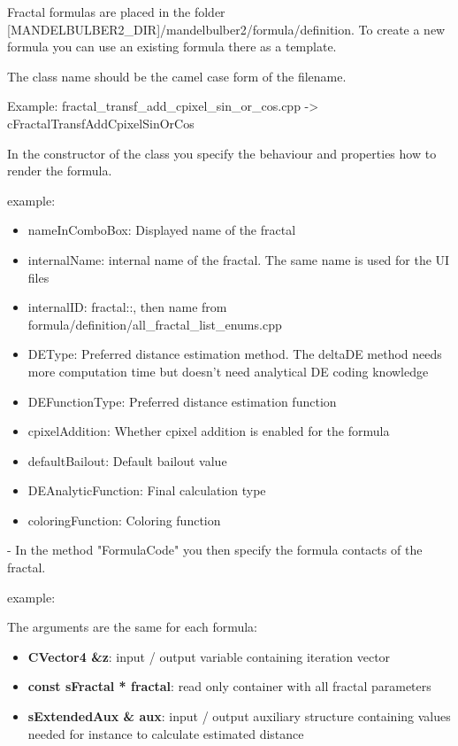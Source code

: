Fractal formulas are placed in the folder [MANDELBULBER2\_DIR]/mandelbulber2/formula/definition.
To create a new formula you can use an existing formula there as a template.

The class name should be the camel case form of the filename.

Example:
fractal\_transf\_add\_cpixel\_sin\_or\_cos.cpp -> cFractalTransfAddCpixelSinOrCos

In the constructor of the class you specify the behaviour and properties how to render the formula.

example:


\begin{itemize}
	\item nameInComboBox: Displayed name of the fractal
	\item internalName: internal name of the fractal. The same name is used for the UI files
	\item internalID: fractal::, then name from formula/definition/all\_fractal\_list\_enums.cpp 
	\item DEType: Preferred distance estimation method. The deltaDE method needs more computation time but doesn't need analytical DE coding knowledge
	\item DEFunctionType: Preferred distance estimation function
	\item cpixelAddition: Whether cpixel addition is enabled for the formula
	\item defaultBailout: Default bailout value
	\item DEAnalyticFunction: Final calculation type
	\item coloringFunction: Coloring function
\end{itemize}

- In the method "FormulaCode" you then specify the formula contacts of the fractal.

example:


The arguments are the same for each formula:
\begin{itemize}
	\item \textbf{CVector4 \&z}: input / output variable containing iteration vector
	\item \textbf{const sFractal * fractal}: read only container with all fractal parameters
	\item \textbf{sExtendedAux \& aux}: input / output auxiliary structure containing values 
		needed for instance to calculate estimated distance
\end{itemize}

